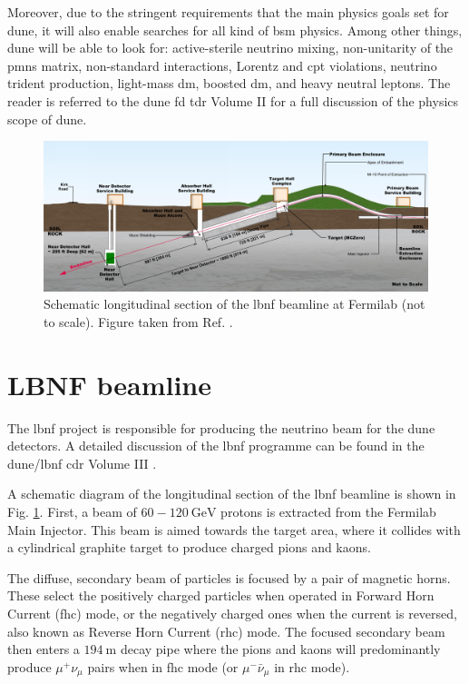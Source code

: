 Moreover, due to the stringent requirements that the main physics goals set for \gls{dune}, it will also enable searches for all kind of \gls{bsm} physics. Among other things, \gls{dune} will be able to look for: active-sterile neutrino mixing, non-unitarity of the \gls{pmns} matrix, non-standard interactions, Lorentz and \gls{cpt} violations, neutrino trident production, light-mass \gls{dm}, boosted \gls{dm}, and heavy neutral leptons. The reader is referred to the \gls{dune} \gls{fd} \gls{tdr} Volume II \cite{DUNE2020TDR2} for a full discussion of the physics scope of \gls{dune}.

\begin{figure}[t]
	\centering
	\includegraphics[width=0.95\linewidth]{Images/DUNE/LBNF/beamline-sideview}
	\caption[Schematic longitudinal section of the \gls{lbnf} beamline at Fermilab.]{Schematic longitudinal section of the \gls{lbnf} beamline at Fermilab (not to scale). Figure taken from Ref. \cite{DUNE2016CDR3}.}
	\label{fig:lbnf_beamline}
\end{figure}

\section{LBNF beamline}

The \gls{lbnf} project is responsible for producing the neutrino beam for the \gls{dune} detectors. A detailed discussion of the \gls{lbnf} programme can be found in the \gls{dune}/\gls{lbnf} \gls{cdr} Volume III \cite{DUNE2016CDR3}.

A schematic diagram of the longitudinal section of the \gls{lbnf} beamline is shown in Fig. \ref{fig:lbnf_beamline}. First, a beam of $60-120~\mathrm{GeV}$ protons is extracted from the Fermilab Main Injector. This beam is aimed towards the target area, where it collides with a cylindrical graphite target to produce charged pions and kaons.

The diffuse, secondary beam of particles is focused by a pair of magnetic horns. These select the positively charged particles when operated in Forward Horn Current (\gls{fhc}) mode, or the negatively charged ones when the current is reversed, also known as Reverse Horn Current (\gls{rhc}) mode. The focused secondary beam then enters a $194~\mathrm{m}$ decay pipe where the pions and kaons will predominantly produce $\mu^{+}\nu_{\mu}$ pairs when in \gls{fhc} mode (or $\mu^{-}\bar{\nu}_{\mu}$ in \gls{rhc} mode).

